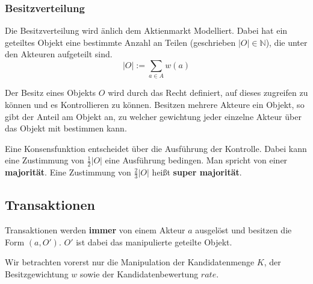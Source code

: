 \documentclass[]{article}
\begin{document}


\subsubsection{Besitzverteilung}


Die Besitzverteilung wird änlich dem Aktienmarkt Modelliert. Dabei hat ein geteiltes Objekt eine bestimmte Anzahl an Teilen (geschrieben $|O| \in \mathbb{N}$), die unter den Akteuren aufgeteilt sind. 
\[ |O| := \sum_{a \in A} w(a) \] 

Der Besitz eines Objekts $O$ wird durch das Recht definiert, auf dieses zugreifen zu können und es Kontrollieren zu können\cite{Waldron2004}. Besitzen mehrere Akteure ein Objekt, so gibt der Anteil am Objekt an, zu welcher gewichtung jeder einzelne Akteur über das Objekt mit bestimmen kann.

Eine Konsensfunktion entscheidet über die Ausführung der Kontrolle. Dabei kann eine Zustimmung von $\frac{1}{2}|O|$ eine Ausführung bedingen. Man spricht von einer \textbf{majorität}. Eine Zustimmung von $\frac{2}{3}|O|$ heißt \textbf{super majorität}.





% 



\subsection {Transaktionen}

Transaktionen werden \textbf{immer} von einem Akteur $a$ ausgelöst und besitzen die Form $(a, O')$. $O'$ ist dabei das manipulierte geteilte Objekt.

Wir betrachten vorerst nur die Manipulation der Kandidatenmenge $K$, der Besitzgewichtung $w$ sowie der Kandidatenbewertung $rate$. 
\end{document}
